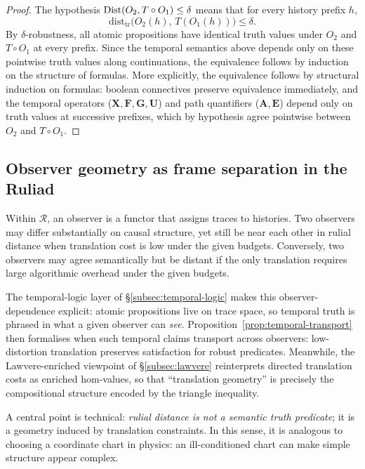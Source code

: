 \documentclass{aion}
\newcommand{\Ruliad}{\mathcal{R}}
\begin{document}
\begin{proof}
The hypothesis $\operatorname{Dist}(O_2,T\circ O_1)\le\delta$ means that for every history prefix $h$,
\[
  \mathrm{dist}_{\mathrm{tr}}\bigl(O_2(h),\,T(O_1(h))\bigr)\le\delta.
\]
By $\delta$-robustness, all atomic propositions have identical truth values under $O_2$ and $T\circ O_1$ at every prefix.
Since the temporal semantics above depends only on these pointwise truth values along continuations,
the equivalence follows by induction on the structure of formulas.
More explicitly, the equivalence follows by structural induction on formulas: boolean connectives preserve equivalence immediately, and the temporal operators ($\mathbf{X},\mathbf{F},\mathbf{G},\mathbf{U}$)
and path quantifiers ($\mathbf{A},\mathbf{E}$) depend only on truth values at successive prefixes, which by hypothesis agree pointwise between
$O_2$ and $T\circ O_1$.
\end{proof}

\subsection{Observer geometry as frame separation in the Ruliad}
\label{subsec:ruliad-geometry}

Within $\Ruliad$, an observer is a functor that assigns traces to histories.
Two observers may differ substantially on causal structure, yet still be near each other in rulial distance when translation cost is low under the given budgets.
Conversely, two observers may agree semantically but be distant if the only translation requires large algorithmic overhead under the given budgets.

The temporal-logic layer of \S\ref{subsec:temporal-logic} makes this observer-dependence explicit:
atomic propositions live on trace space, so temporal truth is phrased in what a given observer can \emph{see}.
Proposition~\ref{prop:temporal-transport} then formalises when such temporal claims transport across observers:
low-distortion translation preserves satisfaction for robust predicates.
Meanwhile, the Lawvere-enriched viewpoint of \S\ref{subsec:lawvere} reinterprets directed translation costs as enriched hom-values,
so that ``translation geometry'' is precisely the compositional structure encoded by the triangle inequality.

A central point is technical: \emph{rulial distance is not a semantic truth predicate}; it is a geometry induced by translation constraints.
In this sense, it is analogous to choosing a coordinate chart in physics: an ill-conditioned chart can make simple structure appear complex.
\end{document}
